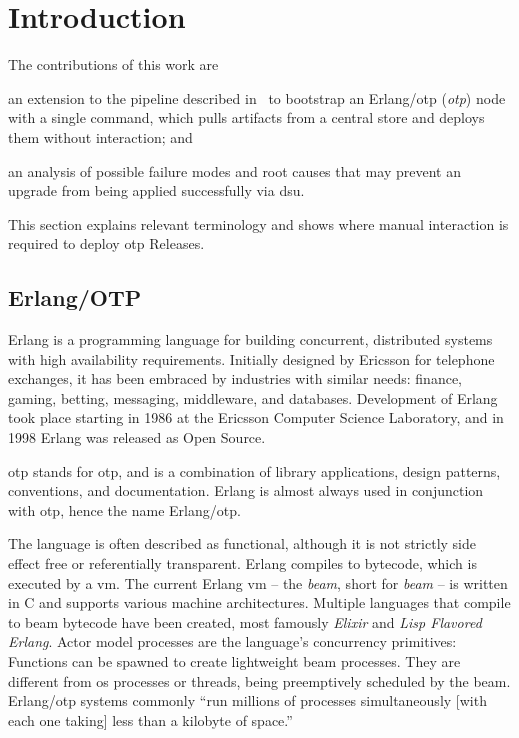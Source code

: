 \section{Introduction}

The contributions of this work are \begin{enumerate*}[label=(\roman*)]
  \item an extension to the pipeline described in~\cite{zak18} to bootstrap an Erlang/\acrshort{otp} (\emph{\acrlong{otp}}) node with a single command, which pulls artifacts from a central store and deploys them without interaction; and
  \item an analysis of possible failure modes and root causes that may prevent an upgrade from being applied successfully via \acrfull{dsu}.
\end{enumerate*} This section explains relevant terminology and shows where manual interaction is required to deploy \acrshort{otp} Releases.

\subsection{Erlang/OTP}

Erlang is a programming language for building concurrent, distributed systems with high availability requirements. Initially designed by Ericsson for telephone exchanges, it has been embraced by industries with similar needs: finance, gaming, betting, messaging, middleware, and databases. Development of Erlang took place starting in 1986 at the Ericsson Computer Science Laboratory, and in 1998 Erlang was released as Open Source.~\cite{armstrong2007history}

\acrshort{otp} stands for \acrlong{otp}, and is a combination of library applications, design patterns, conventions, and documentation. Erlang is almost always used in conjunction with \acrshort{otp}, hence the name Erlang/\acrshort{otp}.~\cite{ferd}

The language is often described as functional, although it is not strictly side effect free or referentially transparent. Erlang compiles to bytecode, which is executed by a \acrfull{vm}. The current Erlang \acrshort{vm} – the \emph{\acrshort{beam}}, short for \emph{\acrlong{beam}} – is written in C and supports various machine architectures. Multiple languages that compile to \acrshort{beam} bytecode have been created, most famously \emph{Elixir} and \emph{Lisp Flavored Erlang}. Actor model processes are the language's concurrency primitives: Functions can be spawned to create lightweight \acrshort{beam} processes. They are different from \acrfull{os} processes or threads, being preemptively scheduled by the \acrshort{beam}. Erlang/\acrshort{otp} systems commonly ``run millions of processes simultaneously [with each one taking] less than a kilobyte of space.''~\cite{larson}

